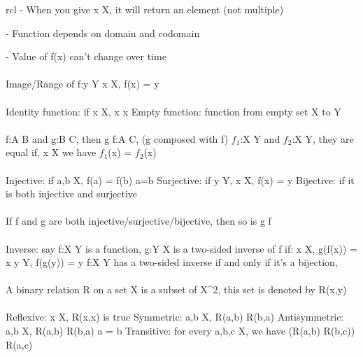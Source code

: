 \documentclass{article}
\begin{document}
\begin{arrary}{rcl}
- When you give \math x \in X\), it will return an element (not multiple)

- Function depends on domain and codomain

- Value of f(x) can't change over time
\\
\\
Image/Range of \math f:{y \in Y \vert \exists x \in X, f(x) = y}\)
\\
\\
Identity function: if x \in X, x \mapsto  x\)
\newline Empty function: function from empty set X to Y
\\
\\
\math f:A \rightarrow B\) and \math g:B \rightarrow C\), then \math g \circ f:A \rightarrow C\), (g composed with f)
\newline \math $f_1$:X \rightarrow Y\) and \math $f_2$:X \rightarrow Y\), they are equal if, \forall x \in X\) we have \math $f_1$(x) = $f_2$(x)\)
\\
\\
Injective: if \forall a,b \in X, f(a) = f(b) \Rightarrow a=b\)
\newline Surjective: if \forall y \in Y, \exists x \in X, f(x) = y\)
\newline Bijective: if it is both injective and surjective
\\
\\
If f and g are both injective/surjective/bijective, then so is \math g \circ f\)
\\
\\
Inverse: say \math f:X \rightarrow Y\) is a function, \math g:Y \rightarrow X\) is a two-sided inverse of f if:
\newline \forall x \in X, g(f(x)) = x
\newline \forall y \in Y, f(g(y)) = y
\newline \math f:X \rightarrow Y\) has a two-sided inverse if and only if it's a bijection,
\\
\\
A binary relation R on a set X is a subset of X^2\), this set is denoted by \math R(x,y)\)
\\
\\
Reflexive: \forall x \in X\), \math R(x,x)\) is true
\newline Symmetric: \forall a,b \in X, R(a,b) \Rightarrow R(b,a)\)
\newline Antisymmetric: \forall a,b \in X, R(a,b) \wedge R(b,a) \Rightarrow a = b\)
\newline Transitive: for every \math a,b,c \in X,\) we have \math (R(a,b) \wedge R(b,c)) \Rightarrow R(a,c)\)


\end{arrary}
\end{document}
